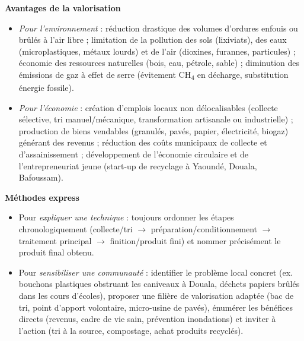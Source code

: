 \documentclass[11pt]{article}
\begin{document}
\begin{aretenir}
\textbf{Avantages de la valorisation}
\begin{itemize}
  \item \emph{Pour l'environnement} : réduction drastique des volumes d'ordures enfouis ou brûlés à l'air libre ; limitation de la pollution des sols (lixiviats), des eaux (microplastiques, métaux lourds) et de l'air (dioxines, furannes, particules) ; économie des ressources naturelles (bois, eau, pétrole, sable) ; diminution des émissions de gaz à effet de serre (évitement CH\textsubscript{4} en décharge, substitution énergie fossile).
  \item \emph{Pour l'économie} : création d'emplois locaux non délocalisables (collecte sélective, tri manuel/mécanique, transformation artisanale ou industrielle) ; production de biens vendables (granulés, pavés, papier, électricité, biogaz) générant des revenus ; réduction des coûts municipaux de collecte et d'assainissement ; développement de l'économie circulaire et de l'entrepreneuriat jeune (start-up de recyclage à Yaoundé, Douala, Bafoussam).
\end{itemize}

\textbf{Méthodes express}
\begin{itemize}
  \item Pour \emph{expliquer une technique} : toujours ordonner les étapes chronologiquement (collecte/tri $\rightarrow$ préparation/conditionnement $\rightarrow$ traitement principal $\rightarrow$ finition/produit fini) et nommer précisément le produit final obtenu.
  \item Pour \emph{sensibiliser une communauté} : identifier le problème local concret (ex. bouchons plastiques obstruant les caniveaux à Douala, déchets papiers brûlés dans les cours d'écoles), proposer une filière de valorisation adaptée (bac de tri, point d'apport volontaire, micro-usine de pavés), énumérer les bénéfices directs (revenus, cadre de vie sain, prévention inondations) et inviter à l'action (tri à la source, compostage, achat produits recyclés).
\end{itemize}
\end{aretenir}
\end{document}
